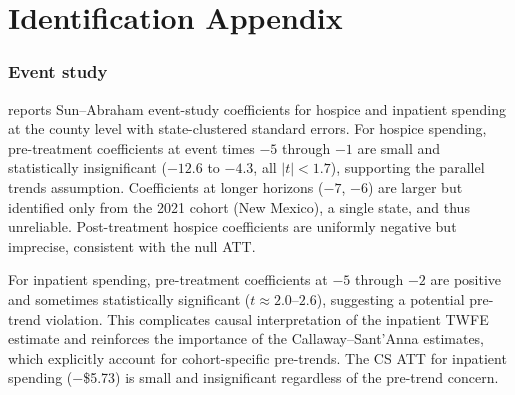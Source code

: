 \documentclass[12pt]{article}
\begin{document}
\section{Identification Appendix}

\subsubsection*{Event study}
 reports Sun--Abraham event-study coefficients for hospice and inpatient spending at the county level with state-clustered standard errors. For hospice spending, pre-treatment coefficients at event times $-5$ through $-1$ are small and statistically insignificant ($-12.6$ to $-4.3$, all $|t| < 1.7$), supporting the parallel trends assumption. Coefficients at longer horizons ($-7$, $-6$) are larger but identified only from the 2021 cohort (New Mexico), a single state, and thus unreliable. Post-treatment hospice coefficients are uniformly negative but imprecise, consistent with the null ATT.

For inpatient spending, pre-treatment coefficients at $-5$ through $-2$ are positive and sometimes statistically significant ($t \approx 2.0$--$2.6$), suggesting a potential pre-trend violation. This complicates causal interpretation of the inpatient TWFE estimate and reinforces the importance of the Callaway--Sant'Anna estimates, which explicitly account for cohort-specific pre-trends. The CS ATT for inpatient spending ($-$\$5.73) is small and insignificant regardless of the pre-trend concern.
\end{document}
